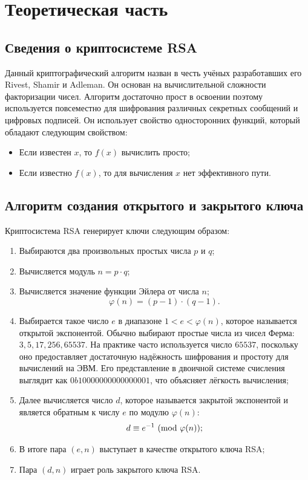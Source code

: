 \section{Теоретическая часть}

\subsection{Сведения о криптосистеме RSA}

Данный криптографический алгоритм назван в честь учёных разработавших его Rivest, Shamir и Adleman. Он основан на вычислительной сложности факторизации чисел. Алгоритм достаточно прост в освоении поэтому используется повсеместно для шифрования различных секретных сообщений и цифровых подписей. Он использует свойство односторонних функций, который обладают следующим свойством:
\begin{itemize}
	\item Если известен $x$, то $f(x)$ вычислить просто;
	\item Если известно $f(x)$, то для вычисления $x$ нет эффективного пути.
\end{itemize}

\subsection{Алгоритм создания открытого и закрытого ключа}

Криптосистема RSA генерирует ключи следующим образом:
\begin{enumerate}
	\item Выбираются два произвольных простых числа $p$ и $q$;
	\item Вычисляется модуль $n=p\cdot q$;
	\item Вычисляется значение функции Эйлера от числа $n$;
	$$
	\varphi(n)=(p-1)\cdot(q-1).
	$$
	\item Выбирается такое число $e$ в диапазоне $1 < e < \varphi(n)$, которое называется открытой экспонентой.
    Обычно выбирают простые числа из чисел Ферма: $3, 5, 17 ,256 ,65537$.
    На практике часто используется число $65537$, поскольку оно предоставляет достаточную надёжность шифрования и простоту для вычислений на ЭВМ.
    Его представление в двоичной системе счисления выглядит как $0b10000000000000001$, что объясняет лёгкость вычисления;
	\item Далее вычисляется число $d$, которое называется закрытой экспонентой и является обратным к числу $e$ по модулю $\varphi(n)$:
	$$
	d \equiv e^{-1} \ (\mathrm{mod}\ \varphi(n));
	$$
	\item В итоге пара $(e,n)$ выступает в качестве открытого ключа RSA;
	\item Пара $(d,n)$ играет роль закрытого ключа RSA.
\end{enumerate}

